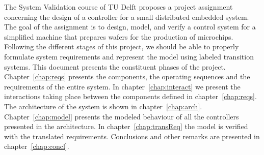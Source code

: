 
The System Validation course of TU Delft proposes a project assignment concerning the design of a controller for a small distributed embedded system.
The goal of the assignment is to design, model, and verify a control system for a simplified machine that prepares wafers for the production of microchips.
Following the different stages of this project, we should be able to properly formulate system requirements and represent the model using labeled transition systems.
This document presents the constituent phases of the project. Chapter~\ref{chap:reqs} presents the components, the operating sequences and the requirements of the entire system. In chapter~\ref{chap:interact} we present the interactions taking place between the components defined in chapter~\ref{chap:reqs}. The architecture of the system is shown in chapter~\ref{chap:arch}. Chapter~\ref{chap:model} presents the modeled behaviour of all the controllers presented in the architecture. In chapter~\ref{chap:transReq} the model is verified with the translated requirements. Conclusions and other remarks are presented in chapter~\ref{chap:concl}.

